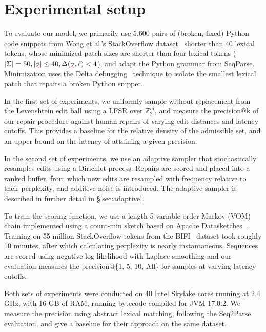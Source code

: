 \documentclass[sigplan,review,anonymous,acmsmall]{acmart}\settopmatter{printfolios=false,printccs=false,printacmref=false}
\begin{document}
\pagebreak\section{Experimental setup}\label{sec:experiments}

To evaluate our model, we primarily use 5,600 pairs of (broken, fixed) Python code snippets from Wong et al.'s StackOverflow dataset~\cite{wong2019syntax} shorter than 40 lexical tokens, whose minimized patch sizes are shorter than four lexical tokens ($|\Sigma| = 50, |\err{\sigma}| \leq 40, \Delta(\err{\sigma}, \ell) < 4$), and adapt the Python grammar from SeqParse. Minimization uses the Delta debugging~\cite{zeller2002isolating} technique to isolate the smallest lexical patch that repairs a broken Python snippet.

In the first set of experiments, we uniformly sample without replacement from the Levenshtein edit ball using a LFSR over $\mathbb{Z}_2^m$, and measure the precision@k of our repair procedure against human repairs of varying edit distances and latency cutoffs. This provides a baseline for the relative density of the admissible set, and an upper bound on the latency of attaining a given precision.

In the second set of experiments, we use an adaptive sampler that stochastically resamples edits using a Dirichlet process. Repairs are scored and placed into a ranked buffer, from which new edits are resampled with frequency relative to their perplexity, and additive noise is introduced. The adaptive sampler is described in further detail in \S\ref{sec:adaptive}.

To train the scoring function, we use a length-5 variable-order Markov (VOM) chain implemented using a count-min sketch based on Apache Datasketches~\cite{apache2022datasketches}. Training on 55 million StackOverflow tokens from the BIFI~\cite{yasunaga2021break} dataset took roughly 10 minutes, after which calculating perplexity is nearly instantaneous. Sequences are scored using negative log likelihood with Laplace smoothing and our evaluation measures the precision@\{1, 5, 10, All\} for samples at varying latency cutoffs.

Both sets of experiments were conducted on 40 Intel Skylake cores running at 2.4 GHz, with 16 GB of RAM, running bytecode compiled for JVM 17.0.2. We measure the precision using abstract lexical matching, following the Seq2Parse~\cite{sakkas2022seq2parse} evaluation, and give a baseline for their approach on the same dataset.
\end{document}

